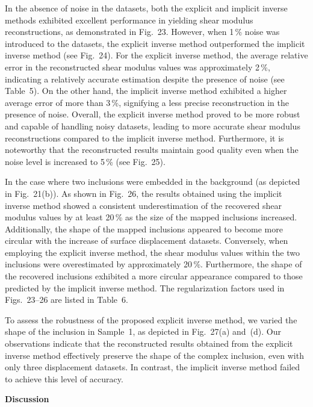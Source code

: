 \documentclass[11pt]{article}
\begin{document}
In the absence of noise in the datasets, both the explicit and
implicit inverse methods exhibited excellent performance in
yielding shear modulus reconstructions, as demonstrated in
Fig.~23. However, when 1\,\% noise was introduced to the
datasets, the explicit inverse method outperformed the implicit
inverse method (see Fig.~24). For the explicit inverse method,
the average relative error in the reconstructed shear modulus
values was approximately 2\,\%, indicating a relatively accurate
estimation despite the presence of noise (see Table~5). On the
other hand, the implicit inverse method exhibited a higher
average error of more than 3\,\%, signifying a less precise
reconstruction in the presence of noise. Overall, the explicit
inverse method proved to be more robust and capable of handling
noisy datasets, leading to more accurate shear modulus
reconstructions compared to the implicit inverse method.
Furthermore, it is noteworthy that the reconstructed results
maintain good quality even when the noise level is increased to
5\,\% (see Fig.~25).

In the case where two inclusions were embedded in the background
(as depicted in Fig.~21(b)). As shown in Fig.~26, the results
obtained using the implicit inverse method showed a consistent
underestimation of the recovered shear modulus values by at
least 20\,\% as the size of the mapped inclusions increased.
Additionally, the shape of the mapped inclusions appeared to
become more circular with the increase of surface displacement
datasets. Conversely, when employing the explicit inverse
method, the shear modulus values within the two inclusions were
overestimated by approximately 20\,\%. Furthermore, the shape
of the recovered inclusions exhibited a more circular appearance
compared to those predicted by the implicit inverse method. The
regularization factors used in Figs.~23--26 are listed in
Table~6.

To assess the robustness of the proposed explicit inverse
method, we varied the shape of the inclusion in Sample~1, as
depicted in Fig.~27(a) and~(d). Our observations indicate that
the reconstructed results obtained from the explicit inverse
method effectively preserve the shape of the complex inclusion,
even with only three displacement datasets. In contrast, the
implicit inverse method failed to achieve this level of
accuracy.

\vspace{0.5em}

\noindent\textbf{Discussion}

\vspace{0.3em}
\end{document}
